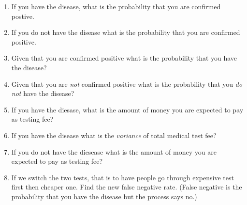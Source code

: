 \documentclass[a4paper, 12pt]{article}
\newcommand{\sanswer}{\vspace{1.25in}}
\newcommand{\manswer}{\vspace{2.5in}}
\begin{document}
\begin{enumerate}
\begin{enumerate}
	\item If you have the disease, what is the probability that you are confirmed postive.
	\sanswer
	\item If you do not have the disease what is the probability that you are confirmed positive.
	\manswer
	\item Given that you are confirmed positive what is the probability that you have the disease?
	\sanswer
	\item Given that you are \emph{not} confirmed positive what is the probability that you \emph{do not} have the disease?
	\sanswer
	\item If you have the diesase, what is the amount of money you are expected to pay as testing fee?
	\sanswer
	\item If you have the disease what is the \emph{variance} of total medical test fee?
	\sanswer
	\item If you do not have the diesease what is the amount of money you are expected to pay as testing fee?
	\sanswer
	\item If we switch the two tests, that is to have people go through expensive test first then cheaper one. Find the new false negative rate. (False negative is the probability that you have the disease but the process says no.)
	\sanswer
	\end{enumerate}


	



\end{enumerate}
\end{document}
